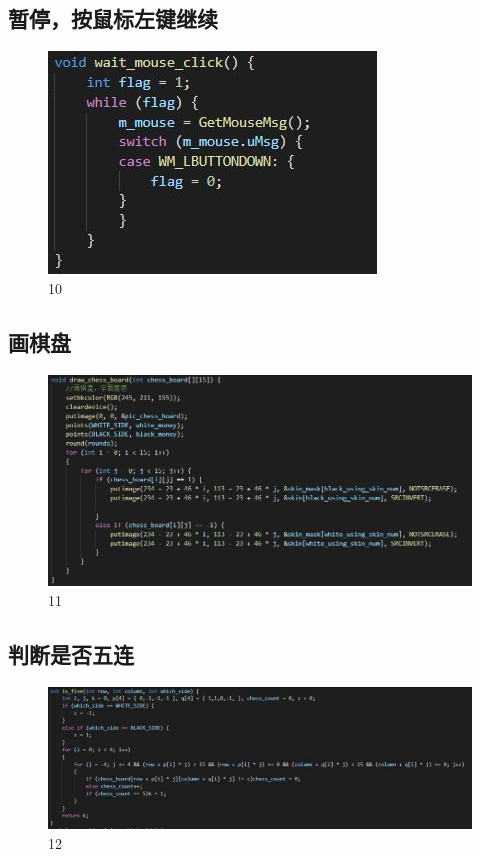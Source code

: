 \documentclass[UTF8]{ctexart}
\begin{document}
\subsection{暂停，按鼠标左键继续}
\begin{figure}[H]
    \centering
    \includegraphics[scale=1.0]{9.jpg}
\caption{10}
\end{figure}
\subsection{画棋盘}
\begin{figure}[H]
    \centering
    \includegraphics[scale=0.65]{10.jpg}
\caption{11}
\end{figure}
\subsection{判断是否五连}
\begin{figure}[H]
    \centering
    \includegraphics[scale=0.60]{11.jpg}
\caption{12}
\end{figure}
\end{document}
